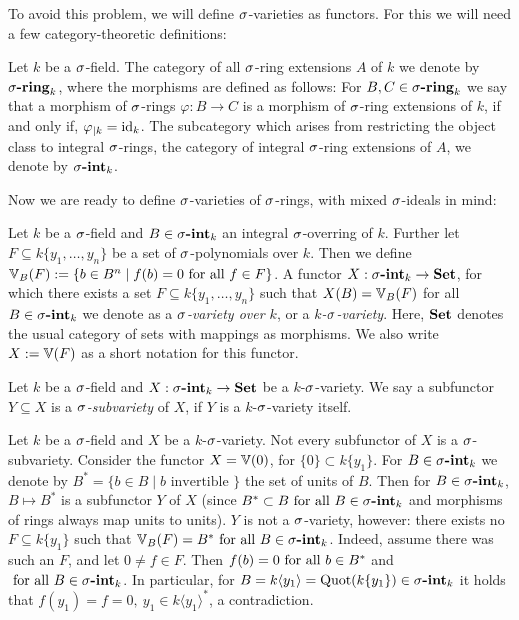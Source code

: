 To avoid this problem, we will define $\sigma$-varieties as functors. For this we will need a few category-theoretic definitions:

\begin{defn}
Let $k$ be a $\sigma$-field. The category of all $\sigma$-ring extensions $A$ of $k$ we denote by $\sringk$, where the morphisms are defined as follows: For $B,C \in \sigma\text{{\normalfont\textbf{-ring}}}_k$ we say that a morphism of $\sigma$-rings $\varphi: B \rightarrow C$ is a morphism of $\sigma$-ring extensions of $k$, if and only if, $\varphi_{|k} = \text{id}_k$.
The subcategory which arises from restricting the object class to integral $\sigma$-rings, the category of integral $\sigma$-ring extensions of $A$, we denote by $\sintk$. \index{$\sintk$} \index{$\sringk$}
\end{defn}

Now we are ready to define $\sigma$-varieties of $\sigma$-rings, with mixed $\sigma$-ideals in mind:

\begin{defn}\label{defnVV}
Let $k$ be a $\sigma$-field and $B \in \sigma\text{{\normalfont\textbf{-int}}}_k$ an integral $\sigma$-overring of $k$. Further let $F \subseteq k\{y_1, \ldots, y_n\}$ be a set of $\sigma$-polynomials over $k$. 
Then we define $\mathbb{V}_B(F):= \{ b \in B^n \mid f(b) = 0 \text{ for all } f \in F \}$. A functor $X: \sigma\text{{\normalfont\textbf{-int}}}_k \rightarrow {\normalfont\textbf{Set}}$, for which there exists a set $F \subseteq k\{y_1, \ldots, y_n \}$ such that $X(B) = \mathbb{V}_B(F)$ for all $B \in \sigma\text{{\normalfont\textbf{-int}}}_k$ we denote as a \emph{$\sigma$-variety over $k$}, or a \emph{$k$-$\sigma$-variety}.
Here, ${\normalfont\textbf{Set}}$ denotes the usual category of sets with mappings as morphisms. We also write $X := \mathbb{V}(F)$ as a short notation for this functor.   
\end{defn}

\begin{defn}
Let $k$ be a $\sigma$-field and $X: \sigma\text{{\normalfont\textbf{-int}}}_k \rightarrow {\normalfont\textbf{Set}}$ be a $k$-$\sigma$-variety. We say a subfunctor $Y \subseteq X$ is a \emph{$\sigma$-subvariety} of $X$, if $Y$ is a $k$-$\sigma$-variety itself. 
\end{defn}

 \begin{rem}
Let $k$ be a $\sigma$-field and $X$ be a $k$-$\sigma$-variety. Not every subfunctor of $X$ is a $\sigma$-subvariety. Consider the functor $X = \mathbb{V}(0)$, for $\{0\} \subset k\{y_1\}$.
For $B \in \sigma\text{{\normalfont\textbf{-int}}}_k$ we denote by $B^* = \{ b \in B \mid b \text{ invertible } \}$ the set of units of $B$. Then for $B \in \sigma\text{{\normalfont\textbf{-int}}}_k$, $B \mapsto B^*$ is a subfunctor $Y$ of $X$ (since $B^* \subset B \text{ for all } B \in \sigma\text{{\normalfont\textbf{-int}}}_k$ and morphisms of rings always map units to units). $Y$ is not a $\sigma$-variety, however:
there exists no $F \subseteq k\{y_1\}$ such that $\mathbb{V}_B(F) = B^* \text{ for all } B \in \sigma\text{{\normalfont\textbf{-int}}}_k$.  Indeed, assume there was such an $F$, and let $0 \neq f \in F$. Then $f(b) = 0 \text{ for all } b \in B^*$ and $\text{ for all } B \in \sigma\text{{\normalfont\textbf{-int}}}_k$. In particular,
for $B = k\langle y_1 \rangle = \operatorname{Quot}(k\{y_1\}) \in \sigma\text{{\normalfont\textbf{-int}}}_k$ it holds that $f(y_1) = f = 0, ~ y_1 \in k \langle y_1 \rangle^*$, a contradiction.  
\end{rem}

